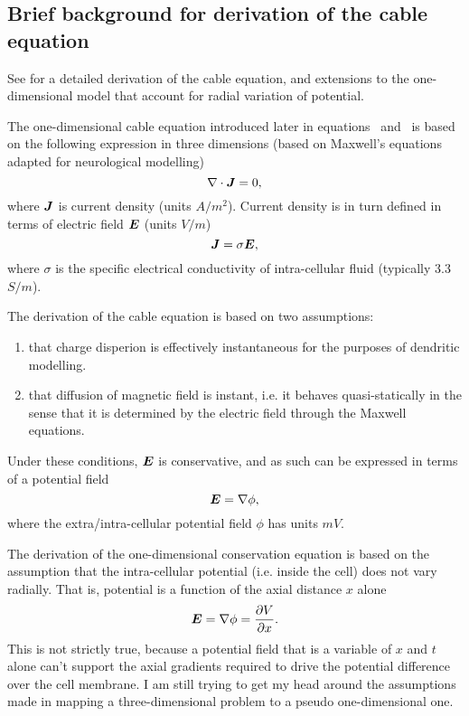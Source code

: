 \subsection{Brief background for derivation of the cable equation}
See \cite{lindsay_2004} for a detailed derivation of the cable equation, and extensions to the one-dimensional model that account for radial variation of potential.

The one-dimensional cable equation introduced later in equations~ and~ is based on the following expression in three dimensions (based on Maxwell's equations adapted for neurological modelling)
\begin{equation}
    \nabla \cdot \bm{J} = 0,
\end{equation}
where $\bm{J}$ is current density (units $A/m^2$).
Current density is in turn defined in terms of electric field $\bm{E}$ (units $V/m$)
\begin{equation}
    \bm{J} = \sigma \bm{E},
\end{equation}
where $\sigma$ is the specific electrical conductivity of intra-cellular fluid (typically 3.3 $S/m$).

The derivation of the cable equation is based on two assumptions:
\begin{enumerate}
    \item that charge disperion is effectively instantaneous for the purposes of dendritic modelling.
    \item that diffusion of magnetic field is instant, i.e. it behaves quasi-statically in the sense that it is determined by the electric field through the Maxwell equations.
\end{enumerate}
Under these conditions, $\bm{E}$ is conservative, and as such can be expressed in terms of a potential field
\begin{equation}
    \bm{E} = \nabla \phi,
\end{equation}
where the extra/intra-cellular potential field $\phi$ has units $mV$.

The derivation of the one-dimensional conservation equation  is based on the assumption that the intra-cellular potential (i.e. inside the cell) does not vary radially.
That is, potential is a function of the axial distance $x$ alone
\begin{equation}
    \bm{E} = \nabla \phi = \frac{\partial{V}}{\partial{x}}.
\end{equation}
This is not strictly true, because a potential field that is a variable of $x$ and $t$ alone can't support the axial gradients required to drive the potential difference over the cell membrane.
I am still trying to get my head around the assumptions made in mapping a three-dimensional problem to a pseudo one-dimensional one.

